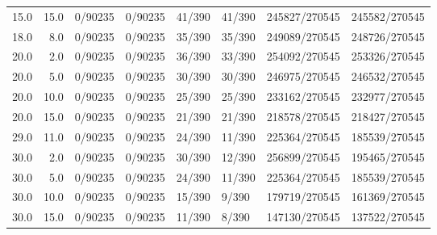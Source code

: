 \begin{tabular}{rrllllll}
15.0 & 15.0 &         0/90235 &             0/90235 &      41/390 &          41/390 & 245827/270545 &   245582/270545 \\
18.0 &  8.0 &         0/90235 &             0/90235 &      35/390 &          35/390 & 249089/270545 &   248726/270545 \\
20.0 &  2.0 &         0/90235 &             0/90235 &      36/390 &          33/390 & 254092/270545 &   253326/270545 \\
20.0 &  5.0 &         0/90235 &             0/90235 &      30/390 &          30/390 & 246975/270545 &   246532/270545 \\
20.0 & 10.0 &         0/90235 &             0/90235 &      25/390 &          25/390 & 233162/270545 &   232977/270545 \\
20.0 & 15.0 &         0/90235 &             0/90235 &      21/390 &          21/390 & 218578/270545 &   218427/270545 \\
29.0 & 11.0 &         0/90235 &             0/90235 &      24/390 &          11/390 & 225364/270545 &   185539/270545 \\
30.0 &  2.0 &         0/90235 &             0/90235 &      30/390 &          12/390 & 256899/270545 &   195465/270545 \\
30.0 &  5.0 &         0/90235 &             0/90235 &      24/390 &          11/390 & 225364/270545 &   185539/270545 \\
30.0 & 10.0 &         0/90235 &             0/90235 &      15/390 &           9/390 & 179719/270545 &   161369/270545 \\
30.0 & 15.0 &         0/90235 &             0/90235 &      11/390 &           8/390 & 147130/270545 &   137522/270545 \\
\bottomrule
\end{tabular}
